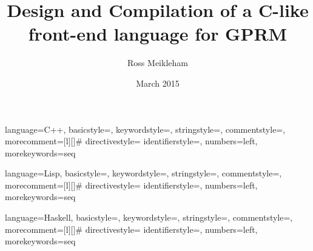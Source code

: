 \documentclass{l4proj}
\begin{document}
 {language=C++,
                basicstyle=\ttfamily,
                keywordstyle=\color{blue}\ttfamily,
                stringstyle=\color{red}\ttfamily,
                commentstyle=\color{gray}\ttfamily,
                morecomment=[l][\color{magenta}]{\#}
                directivestyle={\color{green}}
                identifierstyle=\color{purple},
                numbers=left,
                morekeywords={seq}
}


 {language=Lisp,
                basicstyle=\ttfamily,
                keywordstyle=\color{blue}\ttfamily,
                stringstyle=\color{red}\ttfamily,
                commentstyle=\color{gray}\ttfamily,
                morecomment=[l][\color{magenta}]{\#}
                directivestyle={\color{green}}
                identifierstyle=\color{purple},
                numbers=left,
                morekeywords={seq}
}

 {language=Haskell,
                basicstyle=\ttfamily,
                keywordstyle=\color{blue}\ttfamily,
                stringstyle=\color{red}\ttfamily,
                commentstyle=\color{gray}\ttfamily,
                morecomment=[l][\color{magenta}]{\#}
                directivestyle={\color{green}}
                identifierstyle=\color{purple},
                numbers=left,
                morekeywords={seq}
}


\title{Design and Compilation of a C-like front-end language for GPRM}
\author{Ross Meikleham}
\date{March 2015}
\maketitle


\begin{abstract}

\end{abstract}

\educationalconsent
%
%
\tableofcontents

\setlength{\parindent}{0pt}





\end{document}
